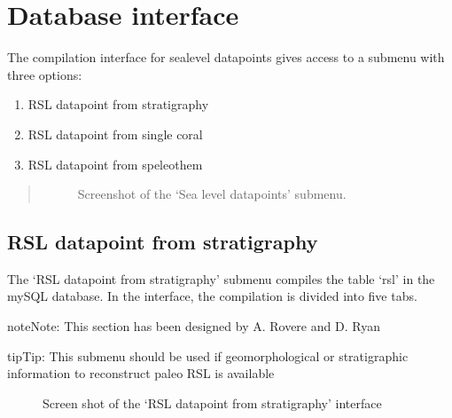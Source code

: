 \documentclass[letterpaper,10pt,english]{sphinxmanual}
\begin{document}
\chapter{Database interface}
\label{\detokenize{interface:database-interface}}\label{\detokenize{interface::doc}}
The compilation interface for sea\sphinxhyphen{}level datapoints gives access to a sub\sphinxhyphen{}menu with three options:
\begin{enumerate}
%
\item {} 
RSL datapoint from stratigraphy

\item {} 
RSL datapoint from single coral

\item {} 
RSL datapoint from speleothem

\end{enumerate}
\begin{quote}

\begin{figure}[htbp]
\centering
\capstart

\noindent{}
\caption{Screenshot of the ‘Sea level datapoints’ submenu.}\label{\detokenize{interface:id1}}\end{figure}
\end{quote}


\section{RSL datapoint from stratigraphy}
\label{\detokenize{interface:rsl-datapoint-from-stratigraphy}}
The ‘RSL datapoint from stratigraphy’ sub\sphinxhyphen{}menu compiles the table ‘rsl’ in the mySQL database. In the interface, the compilation is divided into five tabs.

\begin{sphinxadmonition}{note}{Note:}
This section has been designed by A. Rovere and D. Ryan
\end{sphinxadmonition}

\begin{sphinxadmonition}{tip}{Tip:}
This sub\sphinxhyphen{}menu should be used if geomorphological or stratigraphic information to reconstruct paleo RSL is available
\end{sphinxadmonition}

\begin{figure}[htbp]
\centering
\capstart

\noindent{}
\caption{Screen shot of the ‘RSL datapoint from stratigraphy’ interface}\label{\detokenize{interface:id2}}\end{figure}
\end{document}
